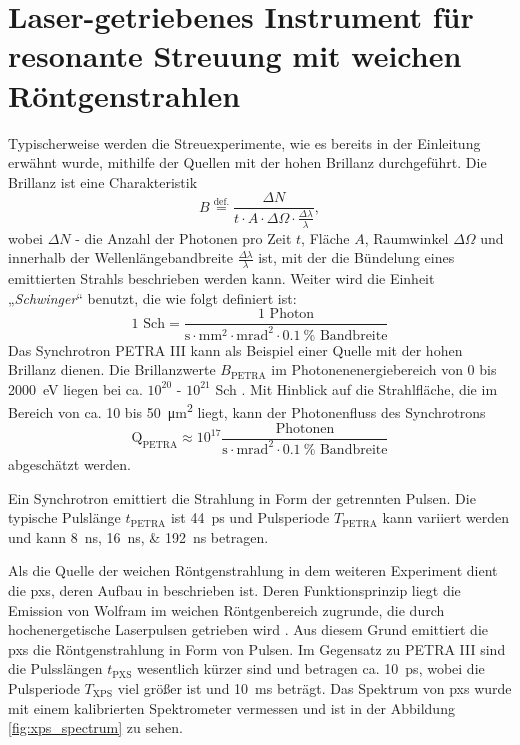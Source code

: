 \chapter{Laser-getriebenes Instrument für resonante Streuung mit weichen Röntgenstrahlen}
\label{text:quelle_roentgen}
Typischerweise werden die Streuexperimente, wie es bereits in der Einleitung erwähnt wurde, mithilfe der Quellen mit der hohen Brillanz durchgeführt. Die Brillanz ist eine Charakteristik
\begin{equation}
    B \stackrel{\text{def.}}{=} \frac{\Delta N}{t\cdot A \cdot \Delta \Omega \cdot \frac{\Delta \lambda}{\lambda}},
\end{equation}
wobei $\Delta N$ - die Anzahl der Photonen pro Zeit $t$, Fläche $A$, Raumwinkel $\Delta \Omega$ und innerhalb der Wellenlängebandbreite $\frac{\Delta \lambda}{\lambda}$ ist, mit der die Bündelung eines emittierten Strahls beschrieben werden kann. Weiter wird die Einheit „\emph{Schwinger}“ benutzt, die wie folgt definiert ist:
\begin{equation}
    1 \text{ Sch} = \frac{1 \text{ Photon}}{\si{\second}\cdot \si{\milli\meter\squared}\cdot \si{\milli\radian\squared}\cdot\SI{0,1}{\percent}\text{ Bandbreite}}
\end{equation}
Das Synchrotron PETRA III kann als Beispiel einer Quelle mit der hohen Brillanz dienen. Die Brillanzwerte $B_\text{PETRA}$ im Photonenenergiebereich von 0 bis \SI{2000}{\eV} liegen bei ca. $10^{20}$ - $10^{21}$ Sch \cite[Abb. 1]{franz_technical_2006}. Mit Hinblick auf die Strahlfläche, die im Bereich von ca. 10 bis \SI{50}{\micro\meter\squared} liegt, \cite{viefhaus_variable_2013} kann der Photonenfluss des Synchrotrons
\begin{equation}
    \text{Q}_\text{PETRA} \approx 10^{17} \frac{\text{Photonen}}{\si{\second}\cdot\si{\milli\radian\squared}\cdot\SI{0,1}{\percent}\text{ Bandbreite}}
\end{equation}
abgeschätzt werden.

\noindent
Ein Synchrotron emittiert die Strahlung in Form der getrennten Pulsen. Die typische Pulslänge $t_\text{PETRA}$ ist \SI{44}{\pico\second} und Pulsperiode $T_\text{PETRA}$ kann variiert werden und kann \qtylist{8;16;192}{\nano\second} \cite{petra-values-website} betragen.

\noindent
Als die Quelle der weichen Röntgenstrahlung in dem weiteren Experiment dient die \gls{pxs}, deren Aufbau in \cite{schick_laser-driven_2021} beschrieben ist. Deren Funktionsprinzip liegt die Emission von Wolfram im weichen Röntgenbereich zugrunde, die durch hochenergetische Laserpulsen getrieben wird \cite{mantouvalou_high_2015}. Aus diesem Grund emittiert die \gls{pxs} die Röntgenstrahlung in Form von Pulsen. Im Gegensatz zu PETRA III sind die Pulsslängen $t_\text{PXS}$ wesentlich kürzer sind und betragen ca. \SI{10}{\pico\second}, wobei die Pulsperiode $T_\text{XPS}$ viel größer ist und \SI{10}{\milli\second} beträgt. Das Spektrum von \gls{pxs} wurde mit einem kalibrierten Spektrometer vermessen und ist in der Abbildung \ref{fig:xps_spectrum} zu sehen.

